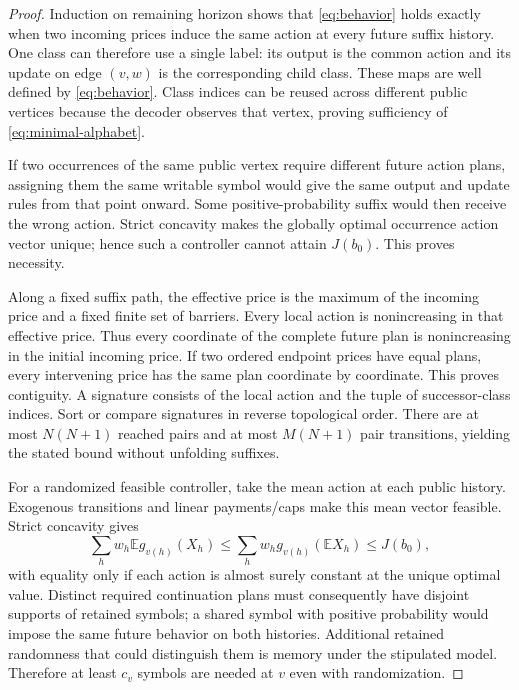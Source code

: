 \begin{proof}
Induction on remaining horizon shows that \eqref{eq:behavior} holds exactly when two incoming prices induce the same action at every future suffix history. One class can therefore use a single label: its output is the common action and its update on edge $(v,w)$ is the corresponding child class. These maps are well defined by \eqref{eq:behavior}. Class indices can be reused across different public vertices because the decoder observes that vertex, proving sufficiency of \eqref{eq:minimal-alphabet}.

If two occurrences of the same public vertex require different future action plans, assigning them the same writable symbol would give the same output and update rules from that point onward. Some positive-probability suffix would then receive the wrong action. Strict concavity makes the globally optimal occurrence action vector unique; hence such a controller cannot attain $J(b_0)$. This proves necessity.

Along a fixed suffix path, the effective price is the maximum of the incoming price and a fixed finite set of barriers. Every local action is nonincreasing in that effective price. Thus every coordinate of the complete future plan is nonincreasing in the initial incoming price. If two ordered endpoint prices have equal plans, every intervening price has the same plan coordinate by coordinate. This proves contiguity. A signature consists of the local action and the tuple of successor-class indices. Sort or compare signatures in reverse topological order. There are at most $N(N+1)$ reached pairs and at most $M(N+1)$ pair transitions, yielding the stated bound without unfolding suffixes.

For a randomized feasible controller, take the mean action at each public history. Exogenous transitions and linear payments/caps make this mean vector feasible. Strict concavity gives
\[
 \sum_hw_h\mathbb E g_{v(h)}(X_h)
 \leq \sum_hw_h g_{v(h)}(\mathbb E X_h)\leq J(b_0),
\]
with equality only if each action is almost surely constant at the unique optimal value. Distinct required continuation plans must consequently have disjoint supports of retained symbols; a shared symbol with positive probability would impose the same future behavior on both histories. Additional retained randomness that could distinguish them is memory under the stipulated model. Therefore at least $c_v$ symbols are needed at $v$ even with randomization.\end{proof}

